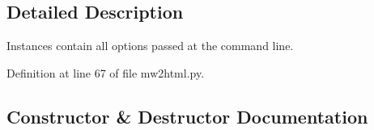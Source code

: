 \subsection{Detailed Description}
\begin{DoxyVerb}Instances contain all options passed at the command line.
\end{DoxyVerb}
 

Definition at line 67 of file mw2html.\+py.



\subsection{Constructor \& Destructor Documentation}
